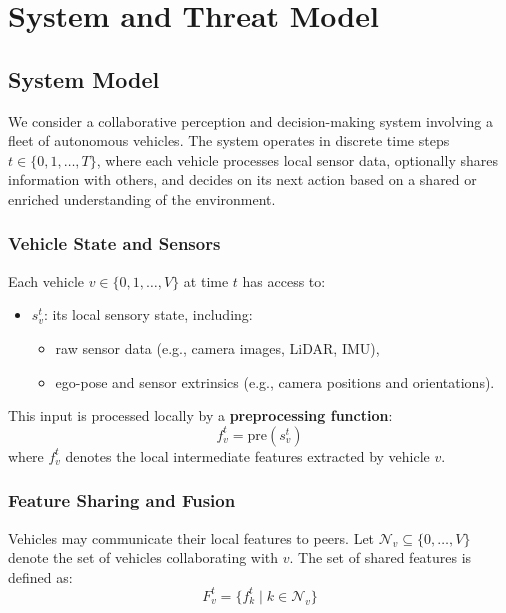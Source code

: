 \chapter{System and Threat Model}
\label{models}

\section{System Model}

We consider a collaborative perception and decision-making system involving a fleet of autonomous vehicles. The system operates in discrete time steps \( t \in \{0, 1, \dots, T\} \), where each vehicle processes local sensor data, optionally shares information with others, and decides on its next action based on a shared or enriched understanding of the environment.

\subsection{Vehicle State and Sensors}

Each vehicle \( v \in \{0, 1, \dots, V\} \) at time \( t \) has access to:

\begin{itemize}
    \item \( s_v^t \): its local sensory state, including:
    \begin{itemize}
        \item raw sensor data (e.g., camera images, LiDAR, IMU),
        \item ego-pose and sensor extrinsics (e.g., camera positions and orientations).
    \end{itemize}
\end{itemize}

This input is processed locally by a \textbf{preprocessing function}:
\[
f_v^t = \text{pre}(s_v^t)
\]
where \( f_v^t \) denotes the local intermediate features extracted by vehicle \( v \).

\subsection{Feature Sharing and Fusion}

Vehicles may communicate their local features to peers. Let \( \mathcal{N}_v \subseteq \{0, \dots, V\} \) denote the set of vehicles collaborating with \( v \). The set of shared features is defined as:
\[
F_v^t = \{f_k^t \mid k \in \mathcal{N}_v\}
\]


